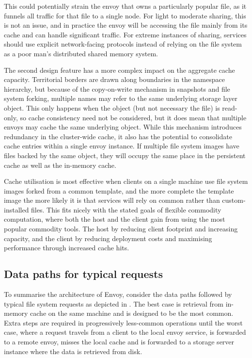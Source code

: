 This could potentially strain the envoy that owns a particularly popular file, as it funnels all traffic for that file to a single node. For light to moderate sharing, this is not an issue, and in practice the envoy will be accessing the file mainly from its cache and can handle significant traffic. For extreme instances of sharing, services should use explicit network-facing protocols instead of relying on the file system as a poor man's distributed shared memory system.

The second design feature has a more complex impact on the aggregate cache capacity. Territorial borders are drawn along boundaries in the namespace hierarchy, but because of the copy-on-write mechanism in snapshots and file system forking, multiple names may refer to the same underlying storage layer object. This only happens when the object (but not necessary the file) is read-only, so cache consistency need not be considered, but it does mean that multiple envoys may cache the same underlying object. While this mechanism introduces redundancy in the cluster-wide cache, it also has the potential to consolidate cache entries within a single envoy instance. If multiple file system images have files backed by the same object, they will occupy the same place in the persistent cache as well as the in-memory cache.

Cache utilisation is most effective when clients on a single machine use file system images forked from a common template, and the more complete the template image the more likely it is that services will rely on common rather than custom-installed files. This fits nicely with the stated goals of flexible commodity computation, where both the host and the client gain from using the most popular commodity tools. The host by reducing client footprint and increasing capacity, and the client by reducing deployment costs and maximising performance through increased cache hits.

\subsection{Data paths for typical requests}

To summarise the architecture of Envoy, consider the data paths followed by typical file system requests as depicted in . The best case is retrieval from in-memory cache on the same machine and is designed to be the most common. Extra steps are required in progressively less-common operations until the worst case, where a request travels from a client to the local envoy service, is forwarded to a remote envoy, misses the local cache and is forwarded to a storage server instance where the data is retrieved from disk.

